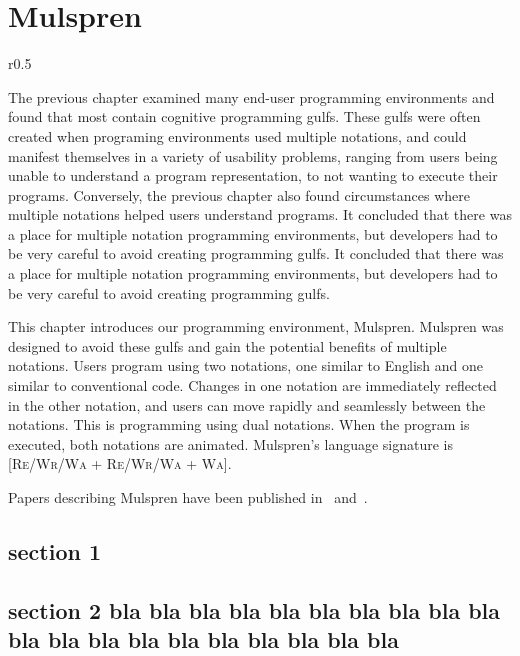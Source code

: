 \documentclass[12pt]{report}
\newcommand{\LangSig}[1]{\textsc{[#1]}} %
\begin{document}
\dominitoc \tableofcontents
\chapter{Mulspren}\label{chapter+mulspren}
\begin{wrapfigure}{r}{0.5\linewidth}
\begin{minipage}{\linewidth}
\vspace{-2.\baselineskip}
\minitoc
\vspace{-1.\baselineskip}
\end{minipage}
\end{wrapfigure}
The previous chapter examined many end-user programming environments
and found that most contain cognitive programming gulfs.
These gulfs were often created when programing environments used
multiple notations, and could manifest themselves in a variety of
usability problems, ranging from users being unable to understand
a program representation, to not wanting to execute their programs.
Conversely, the previous chapter also found circumstances where multiple
notations helped users understand programs.
It concluded that there was a place for multiple notation programming
environments, but developers had to be very careful to avoid creating
programming gulfs.
It concluded that there was a place for multiple notation programming
environments, but developers had to be very careful to avoid creating
programming gulfs.

This chapter introduces our programming environment, Mulspren.
Mulspren was designed to avoid these gulfs and gain the potential
benefits of multiple notations.
Users program using two notations, one similar to English and one
similar to conventional code.
Changes in one notation are immediately reflected in the other notation,
and users can move rapidly and seamlessly between the notations.
This is programming using dual notations.
When the program is executed, both notations are animated.
Mulspren's language signature is \LangSig{Re/Wr/Wa + Re/Wr/Wa + Wa}.

Papers describing Mulspren have been published in~\cite{Wright02-2}
and~\cite{Wright03-3}.

\section{section 1}
\section{section 2 bla bla bla bla bla bla bla bla bla bla bla
bla bla bla bla bla bla bla bla bla}
\end{document}
